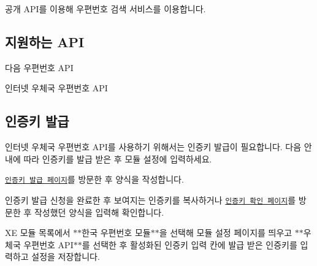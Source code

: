 공개 A\-P\-I를 이용해 우편번호 검색 서비스를 이용합니다.

\subsection*{지원하는 A\-P\-I}


\begin{DoxyEnumerate}
\item 다음 우편번호 A\-P\-I
\item 인터넷 우체국 우편번호 A\-P\-I
\end{DoxyEnumerate}

\subsection*{인증키 발급}

인터넷 우체국 우편번호 A\-P\-I를 사용하기 위해서는 인증키 발급이 필요합니다. 다음 안내에 따라 인증키를 발급 받은 후 모듈 설정에 입력하세요.


\begin{DoxyEnumerate}
\item \href{http://biz.epost.go.kr/openapi/openapi_request.jsp?subGubun=sub_3&subGubun_1=cum_38&gubun=m07}{\tt 인증키 발급 페이지}를 방문한 후 양식을 작성합니다.
\item 인증키 발급 신청을 완료한 후 보여지는 인증키를 복사하거나 \href{http://biz.epost.go.kr/openapi/openapi_reqresult_chk.jsp?subGubun=sub_3&subGubun_1=cum_39&gubun=m07}{\tt 인증키 확인 페이지}를 방문한 후 작성했던 양식을 입력해 확인합니다.
\item X\-E 모듈 목록에서 $\ast$$\ast$한국 우편번호 모듈$\ast$$\ast$을 선택해 모듈 설정 페이지를 띄우고 $\ast$$\ast$우체국 우편번호 A\-P\-I$\ast$$\ast$를 선택한 후 활성화된 인증키 입력 칸에 발급 받은 인증키를 입력하고 설정을 저장합니다. 
\end{DoxyEnumerate}